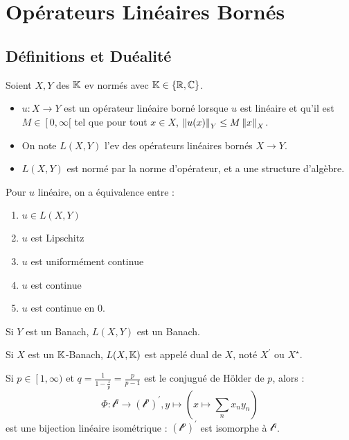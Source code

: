 \documentclass{cours}
\begin{document}
\section{Opérateurs Linéaires Bornés}
\subsection{Définitions et Duéalité}
\begin{definition}
    Soient $X, Y$ des $\mathbb{K}$ ev normés avec $\mathbb{K} \in \left\{\mathbb{R}, \mathbb{C}\right\}$.
    \begin{itemize}
        \item $u : X \to Y$ est un opérateur linéaire borné lorsque $u$ est linéaire et qu'il est $M\in \left[0,\infty[\right.$ tel que pour tout $x \in X$, $\left\lVert u(x) \right\rVert_{Y} \leq M\left\lVert x \right\rVert_{X}$.
        \item On note $L(X, Y)$ l'ev des opérateurs linéaires bornés $X \to Y$.
        \item $L(X, Y)$ est normé par la norme d'opérateur, et a une structure d'algèbre.
    \end{itemize}
\end{definition}

\begin{lemma}
    Pour $u$ linéaire, on a équivalence entre : 
    \begin{enumerate}
        \item $u \in L(X, Y)$
        \item $u$ est Lipschitz
        \item $u$ est uniformément continue
        \item $u$ est continue
        \item $u$ est continue en $0$.
    \end{enumerate}
\end{lemma}

\begin{lemma}
    Si $Y$ est un Banach, $L(X, Y)$ est un Banach.
\end{lemma}

\begin{definition}
    Si $X$ est un $\mathbb{K}$-Banach, $L(X, \mathbb{K})$ est appelé dual de $X$, noté $X^{'}$ ou $X^{\star}$.
\end{definition}

\begin{theorem}
    Si $p \in \left[1, \infty)\right.$ et $q = \frac{1}{1 - \frac{1}{p}} = \frac{p}{p-1}$ est le conjugué de Hölder de $p$, alors : 
    \[
        \Phi : \mathcal{l}^{q} \rightarrow \left(\mathcal{l}^{p}\right)^{'}, y \mapsto \left(x \mapsto \sum_{n} x_{n}y_{n}\right)
    \]
    est une bijection linéaire isométrique : $(\mathcal{l}^p)^{'}$ est isomorphe à $\mathcal{l}^{q}$.
\end{theorem}
\end{document}
